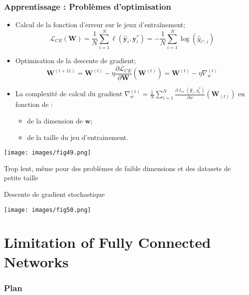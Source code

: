 \documentclass[9pt]{beamer}
\newcommand \ve[1]{\mathbf{#1}}
\begin{document}
\begin{frame}
\frametitle{Apprentissage : Problèmes d'optimisation}
 \begin{minipage}{6cm}
\begin{itemize}
\item Calcul de 	la fonction d'erreur sur le jeux d'entraînement;
\[\mathcal{L}_{CE}(\ve{W})=\frac{1}{N}\sum_{i=1}^N\ell (\hat{\ve{y}}_i,\ve{y}_i^*) = -\frac{1}{N}\sum_{i=1}^{N} \log (\hat{y}_{c^*,i})\]
\item Optimisation de la descente de gradient;
\[\ve{W}^{(t+11)}=\ve{W}^{(t)}-\eta\frac{\partial \mathcal{L}_{CE}}{\partial \ve{W}}\left(\ve{W}^{(t)}\right) = \ve{W}^{(t)}-\eta \nabla_w^{(t)}\]
\item La complexité de calcul du gradient $\nabla_w^{(t)} = \frac{1}{N}\sum_{i=1}^N \frac{\partial \ell_{ce}(\hat{\ve{y}}_i,y_i^*)}{\partial w}\left(\ve{W}_{(t)}\right)$ en fonction de :
\begin{itemize}
\item de la dimension de $\ve{w}$;
\item de la taille du jeu d'entrainement.
\end{itemize}
\end{itemize}
\end{minipage}
\hfill
 \begin{minipage}{3cm}
\begin{center}
 \texttt{[image: images/fig49.png]}  
\end{center}
 \end{minipage}
 \begin{alertblock}{}
Trop lent, même pour des problèmes de faible dimensions et des datasets de petite taille
\end{alertblock}
\end{frame}

\begin{frame}{Descente de gradient stochastique}
\begin{center}
 \texttt{[image: images/fig50.png]}  
\end{center}
\end{frame}

\section{Limitation of Fully Connected Networks}

    \begin{frame}
   	 	\frametitle{Plan}
    		\tableofcontents[currentsection]
	\end{frame}
	
\end{document}
